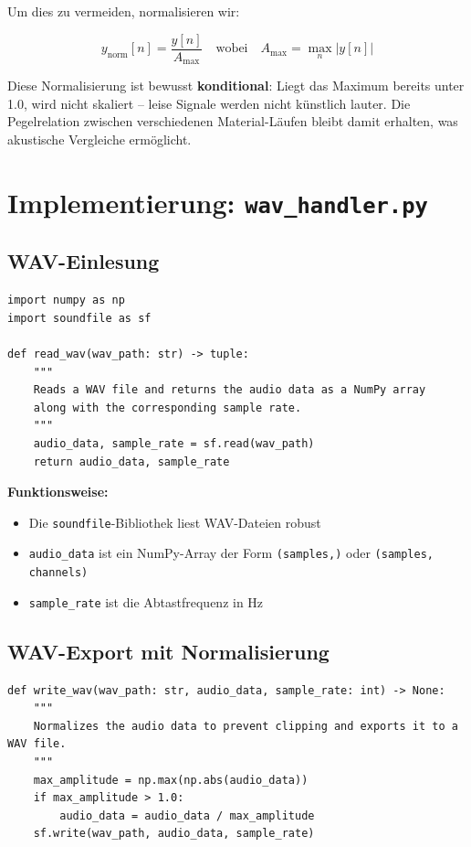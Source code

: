 \documentclass[11pt,a4paper,twoside]{report}
\begin{document}
Um dies zu vermeiden, normalisieren wir:

$$y_{\text{norm}}[n] = \frac{y[n]}{A_{\max}} \quad \text{wobei} \quad A_{\max} = \max_n |y[n]|$$

Diese Normalisierung ist bewusst \textbf{konditional}: Liegt das Maximum bereits
unter 1.0, wird nicht skaliert -- leise Signale werden nicht k\"unstlich lauter.
Die Pegelrelation zwischen verschiedenen Material-L\"aufen bleibt damit
erhalten, was akustische Vergleiche erm\"oglicht.

\section{Implementierung: \texttt{wav\_handler.py}}

\subsection{WAV-Einlesung}

\begin{lstlisting}
import numpy as np
import soundfile as sf

def read_wav(wav_path: str) -> tuple:
    """
    Reads a WAV file and returns the audio data as a NumPy array
    along with the corresponding sample rate.
    """
    audio_data, sample_rate = sf.read(wav_path)
    return audio_data, sample_rate
\end{lstlisting}

\textbf{Funktionsweise:}

\begin{itemize}
    \item Die \texttt{soundfile}-Bibliothek liest WAV-Dateien robust
    \item \texttt{audio\_data} ist ein NumPy-Array der Form \texttt{(samples,)} oder \texttt{(samples, channels)}
    \item \texttt{sample\_rate} ist die Abtastfrequenz in Hz
\end{itemize}

\subsection{WAV-Export mit Normalisierung}

\begin{lstlisting}
def write_wav(wav_path: str, audio_data, sample_rate: int) -> None:
    """
    Normalizes the audio data to prevent clipping and exports it to a WAV file.
    """
    max_amplitude = np.max(np.abs(audio_data))
    if max_amplitude > 1.0:
        audio_data = audio_data / max_amplitude
    sf.write(wav_path, audio_data, sample_rate)
\end{lstlisting}
\end{document}
